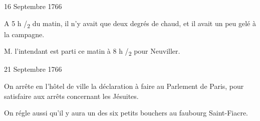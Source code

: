                     

                     \begin{diary}{16 Septembre 1766}{}
                        
                         A 5 h /\textsubscript{2} du matin, il n’y avait que deux
                              degrés de chaud, et il avait un peu gelé
                           à la campagne. \bigskip
        
        
                        
                           M. l’intendant est parti ce matin à 8 h /\textsubscript{2}
                           pour Neuviller. \bigskip
        
        
                     \end{diary}

                     \begin{diary}{21 Septembre 1766}{}
                        
                         On arrête en l’hôtel de ville la déclaration à
                           faire au Parlement de
                           Paris, pour satisfaire
                           aux arrêts concernant les
                              Jésuites. \bigskip
        
        
                         On régle aussi qu’il y aura un des six
                           petits
                           bouchers au faubourg
                              Saint-Fiacre.
                        \bigskip
        
        
                     \end{diary}


